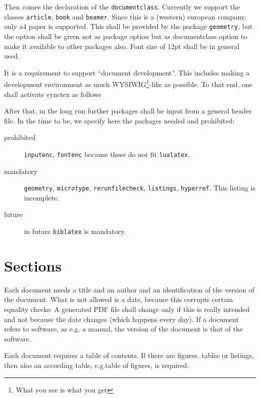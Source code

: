 \documentclass[a4paper,12pt]{article}
\begin{document}

Then comes the declaration of the \texttt{documentclass}. 
Currently we support the classes \texttt{article}, \texttt{book} and \texttt{beamer}. 
Since this is a (western) european company, only a4 paper is supported. 
This shall be provided by the package \texttt{geometry}, 
but the option shall be given not as package option but as documentclass option 
to make it available to other packages also. 
Font size of 12pt shall be in general used. 


It is a requirement to support ``document development''. 
This includes making a development environment as much 
WYSIWIG\footnote{What you see is what you get}-like as possible. 
To that end, one shall activate synctex as follows 



After that, in the long run further packages shall be input from a general header file. 
In the time to be, we specify here the packages needed and prohibited: 
%
\begin{description}
  \item[prohibited] \texttt{inputenc}, \texttt{fontenc} because these do not fit \texttt{lualatex}. 
  \item[mandatory] \texttt{geometry}, \texttt{microtype}, \texttt{rerunfilecheck}, \texttt{listings}, \texttt{hyperref}. 
  This listing is incomplete. 
  \item[future] in future \texttt{biblatex} is mandatory. 
\end{description}

\section{Sections}\label{sec:secs}

Each document needs a title and an author and an identification of the version of the document. 
What is not allowed is a date, because this corrupts certain equality checks: 
A generated PDF file shall change only if this is really intended and not because the date changes 
(which happens every day).  
If a document refers to software, as e.g\@. a manual, 
the version of the document is that of the software. 

Each document requires a table of contents. 
If there are figures, tables or listings, then also an according table, 
e.g.\@ table of figures, is required. 
\end{document}
